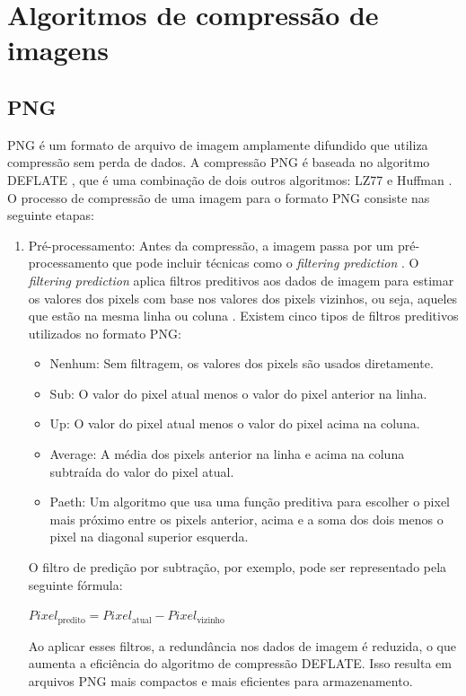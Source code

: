 \section{Algoritmos de compressão de imagens}
\subsection{\acrfull{PNG}}
\acrshort{PNG} é um formato de arquivo de imagem amplamente difundido que utiliza compressão sem perda de dados. A compressão \acrshort{PNG} é baseada no algoritmo DEFLATE \cite{dataCopressionSayood}, que é uma combinação de  dois outros algoritmos: \acrfull{LZ77} \cite{lempelZivArticle} e Huffman \cite{huffmanArticle}.
O processo de compressão de uma imagem para o formato \acrshort{PNG} consiste nas seguinte etapas:
\begin{enumerate}
    \item Pré-processamento:
    \BlankLine
    Antes da compressão, a imagem passa por um pré-processamento que pode incluir técnicas como o \textit{filtering prediction} \cite{compressionTechniquesElakkiya}. O \textit{filtering prediction} aplica filtros preditivos aos dados de imagem para estimar os valores dos pixels com base nos valores dos pixels vizinhos, ou seja, aqueles que estão na mesma linha ou coluna \cite{compressionTechniquesElakkiya}. Existem cinco tipos de filtros preditivos utilizados no formato PNG:
    \begin{itemize}
        \item Nenhum: Sem filtragem, os valores dos pixels são usados diretamente.
        \item Sub: O valor do pixel atual menos o valor do pixel anterior na linha.
        \item Up: O valor do pixel atual menos o valor do pixel acima na coluna.
        \item Average: A média dos pixels anterior na linha e acima na coluna subtraída do valor do pixel atual.
        \item Paeth: Um algoritmo que usa uma função preditiva para escolher o pixel mais próximo entre os pixels anterior, acima e a soma dos dois menos o pixel na diagonal superior esquerda.
    \end{itemize}
    O filtro de predição por subtração, por exemplo, pode ser representado pela seguinte fórmula:
    \begin{center}
        \(\displaystyle Pixel_{\text{predito}} = Pixel_{\text{atual}} - Pixel_{\text{vizinho}}\)
    \end{center}
    Ao aplicar esses filtros, a redundância nos dados de imagem é reduzida, o que aumenta a eficiência do algoritmo de compressão DEFLATE. Isso resulta em arquivos \acrshort{PNG} mais compactos e mais eficientes para armazenamento.


\end{enumerate}

